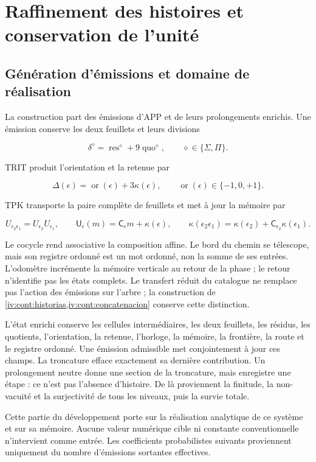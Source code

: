 \section{Raffinement des histoires et conservation de l’unité
}
\label{nuclear:1}
\subsection{Génération d’émissions et domaine de réalisation}

La construction part des émissions d’APP et de leurs prolongements enrichis. Une émission conserve les deux feuillets et leurs divisions


\[
\delta^\diamond=\operatorname{res}^\diamond+9\operatorname{quo}^\diamond,
\qquad \diamond\in\{\Sigma,\Pi\}.
\]

TRIT produit l’orientation et la retenue par

\[
\Delta(\epsilon)=\operatorname{or}(\epsilon)+3\kappa(\epsilon),
\qquad \operatorname{or}(\epsilon)\in\{-1,0,+1\}.
\]

TPK transporte la paire complète de feuillets et met à jour la mémoire par

\[
U_{\epsilon_2\epsilon_1}=U_{\epsilon_2}U_{\epsilon_1},\qquad
\mathsf U_\epsilon(m)=\mathsf C_\epsilon m+\kappa(\epsilon),\qquad
\kappa(\epsilon_2\epsilon_1)
=\kappa(\epsilon_2)+\mathsf C_{\epsilon_2}\kappa(\epsilon_1).
\]

Le cocycle rend associative la composition affine. Le bord du chemin se télescope, mais son registre ordonné est un mot ordonné, non la somme de ses entrées. L’odomètre incrémente la mémoire verticale au retour de la phase ; le retour n’identifie pas les états complets. Le transfert réduit du catalogue ne remplace pas l’action des émissions sur l’arbre ; la construction de \cref{iv:cont:historias,iv:cont:concatenacion} conserve cette distinction.

L’état enrichi conserve les cellules intermédiaires, les deux feuillets, les résidus, les quotients, l’orientation, la retenue, l’horloge, la mémoire, la frontière, la route et le registre ordonné. Une émission admissible met conjointement à jour ces champs. La troncature efface exactement sa dernière contribution. Un prolongement neutre donne une section de la troncature, mais enregistre une étape : ce n’est pas l’absence d’histoire. De là proviennent la finitude, la non-vacuité et la surjectivité de tous les niveaux, puis la survie totale.

Cette partie du développement porte sur la réalisation analytique de ce système et sur sa mémoire. Aucune valeur numérique cible ni constante conventionnelle n’intervient comme entrée. Les coefficients probabilistes suivants proviennent uniquement du nombre d’émissions sortantes effectives.


